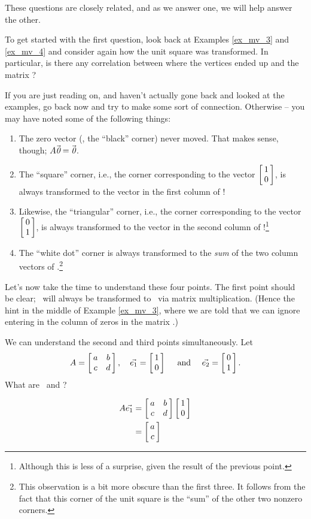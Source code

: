 These questions are closely related, and as we answer one, we will help answer the other.

To get started with the first question, look back at Examples \ref{ex_mv_3} and \ref{ex_mv_4} and consider again how the unit square was transformed. In particular, is there any correlation between where the vertices ended up and the matrix \tta?

If you are just reading on, and haven't actually gone back and looked at the examples, go back now and try to make some sort of connection. Otherwise -- you may have noted some of the following things:
\begin{enumerate}
\item		The zero vector (\zero, the ``black'' corner) never moved. That makes sense, though; $\tta\zero = \zero$. 
\item		The ``square'' corner, i.e., the corner corresponding to the vector $\bmx{c}1\\0\emx$, is always transformed to the vector in the first column of \tta!
\item		Likewise, the ``triangular'' corner, i.e., the corner corresponding to the vector $\bmx{c}0\\1\emx$, is always transformed to the vector in the second column of \tta!\footnote{Although this is less of a surprise, given the result of the previous point.}
\item		The ``white dot'' corner is always transformed to the \textit{sum} of the two column vectors of \tta.\footnote{This observation is a bit more obscure than the first three.  It follows from the fact that this corner of the unit square is the ``sum'' of the other two nonzero corners.}
\end{enumerate}

Let's now take the time to understand these four points. The first point should be clear; \zero\ will always be transformed to \zero\ via matrix multiplication. (Hence the hint in the middle of Example \ref{ex_mv_3}, where we are told that we can ignore entering in the column of zeros in the matrix \ttb.)

We can understand the second and third points simultaneously. Let $$\tta = \bmx{cc}a&b\\c&d\emx, \quad \veone = \bmx{c}1\\0\emx \quad \text{ and } \quad \vetwo = \bmx{c}0\\1\emx.$$ What are \tta\veone\ and \tta\vetwo?

\begin{align*}
\tta\veone &= \bmx{cc}a&b\\c&d\emx\bmx{c}1\\0\emx \\
					&= \bmx{c}a\\c\emx
\end{align*}

